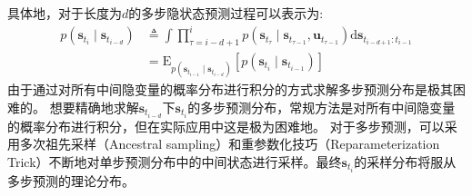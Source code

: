 具体地，对于长度为$d$的多步隐状态预测过程可以表示为:
\begin{equation}
\begin{aligned}
p\left(\boldsymbol{s}_{t_i} \mid \boldsymbol{s}_{t_{i-d}}\right) & \triangleq \int \prod_{\tau=i-d+1}^{i} p\left(\boldsymbol{s}_{t_\tau} \mid \boldsymbol{s}_{t_{\tau-1}},\boldsymbol{u}_{t_{\tau-1}}\right) \mathrm{d} \boldsymbol{s}_{t_{i-d+1}: t_{i-1}} \\
&=\mathrm{E}_{p\left(\boldsymbol{s}_{t_{i-1}} \mid \boldsymbol{s}_{t_{i-d}}\right)}\left[p\left(\boldsymbol{s}_{t_i} \mid \boldsymbol{s}_{t_{i-1}}\right)\right]
\end{aligned}
\label{equ:multistep}
\end{equation}
由于通过对所有中间隐变量的概率分布进行积分的方式求解多步预测分布是极其困难的。
想要精确地求解$\boldsymbol{s}_{t_{i-d}} $下$\boldsymbol{s}_{t_{i}}$的多步预测分布，常规方法是对所有中间隐变量的概率分布进行积分，但在实际应用中这是极为困难地。
对于多步预测，可以采用多次祖先采样（Ancestral sampling）和重参数化技巧（Reparameterization Trick）不断地对单步预测分布中的中间状态进行采样。最终$\boldsymbol{s}_{t_{i}}$的采样分布将服从多步预测的理论分布。

